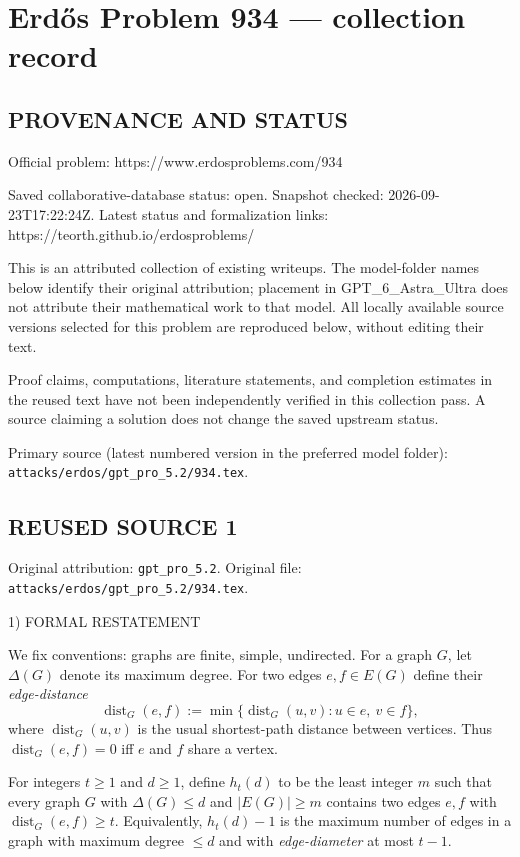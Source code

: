 \section*{Erd\H{o}s Problem 934 --- collection record}

\subsection*{PROVENANCE AND STATUS}
Official problem: https://www.erdosproblems.com/934

Saved collaborative-database status: open.
Snapshot checked: 2026-09-23T17:22:24Z.
Latest status and formalization links: https://teorth.github.io/erdosproblems/

This is an attributed collection of existing writeups. The model-folder names below identify their original attribution; placement in GPT\_6\_Astra\_Ultra does not attribute their mathematical work to that model. All locally available source versions selected for this problem are reproduced below, without editing their text.

Proof claims, computations, literature statements, and completion estimates in the reused text have not been independently verified in this collection pass. A source claiming a solution does not change the saved upstream status.

Primary source (latest numbered version in the preferred model folder): \texttt{attacks/erdos/gpt\_pro\_5.2/934.tex}.

\subsection*{REUSED SOURCE 1}
Original attribution: \texttt{gpt\_pro\_5.2}.
Original file: \texttt{attacks/erdos/gpt\_pro\_5.2/934.tex}.


1) FORMAL RESTATEMENT

We fix conventions: graphs are finite, simple, undirected.
For a graph $G$, let $\Delta(G)$ denote its maximum degree.
For two edges $e,f\in E(G)$ define their \emph{edge-distance}
\[
\operatorname{dist}_G(e,f):=\min\{\operatorname{dist}_G(u,v): u\in e,\ v\in f\},
\]
where $\operatorname{dist}_G(u,v)$ is the usual shortest-path distance between vertices.
Thus $\operatorname{dist}_G(e,f)=0$ iff $e$ and $f$ share a vertex.

For integers $t\ge 1$ and $d\ge 1$, define $h_t(d)$ to be the least integer $m$ such that every graph $G$ with $\Delta(G)\le d$ and $|E(G)|\ge m$ contains two edges $e,f$ with $\operatorname{dist}_G(e,f)\ge t$.
Equivalently, $h_t(d)-1$ is the maximum number of edges in a graph with maximum degree $\le d$ and with \emph{edge-diameter} at most $t-1$.

